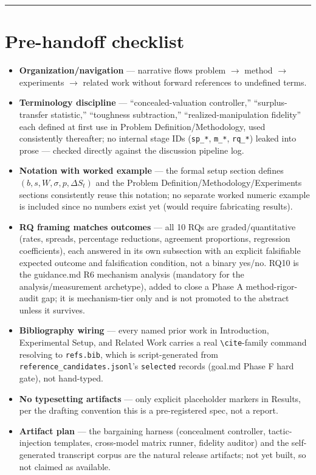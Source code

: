 \documentclass[11pt]{article}
\begin{document}
\vspace{1em}
\hrule
\vspace{1em}

\section*{Pre-handoff checklist}
\begin{itemize}[leftmargin=1.4em]
\item \textbf{Organization/navigation} --- narrative flows problem $\to$ method $\to$ experiments $\to$ related work without forward references to undefined terms.
\item \textbf{Terminology discipline} --- ``concealed-valuation controller,'' ``surplus-transfer statistic,'' ``toughness subtraction,'' ``realized-manipulation fidelity'' each defined at first use in Problem Definition/Methodology, used consistently thereafter; no internal stage IDs (\texttt{sp\_*}, \texttt{m\_*}, \texttt{rq\_*}) leaked into prose --- checked directly against the discussion pipeline log.
\item \textbf{Notation with worked example} --- the formal setup section defines $(b, s, W, \sigma, p, \Delta S_t)$ and the Problem Definition/Methodology/Experiments sections consistently reuse this notation; no separate worked numeric example is included since no numbers exist yet (would require fabricating results).
\item \textbf{RQ framing matches outcomes} --- all 10 RQs are graded/quantitative (rates, spreads, percentage reductions, agreement proportions, regression coefficients), each answered in its own subsection with an explicit falsifiable expected outcome and falsification condition, not a binary yes/no. RQ10 is the guidance.md R6 mechanism analysis (mandatory for the analysis/measurement archetype), added to close a Phase A method-rigor-audit gap; it is mechanism-tier only and is not promoted to the abstract unless it survives.
\item \textbf{Bibliography wiring} --- every named prior work in Introduction, Experimental Setup, and Related Work carries a real \texttt{\textbackslash cite}-family command resolving to \texttt{refs.bib}, which is script-generated from \texttt{reference\_candidates.jsonl}'s \texttt{selected} records (goal.md Phase F hard gate), not hand-typed.
\item \textbf{No typesetting artifacts} --- only explicit placeholder markers in Results, per the drafting convention this is a pre-registered spec, not a report.
\item \textbf{Artifact plan} --- the bargaining harness (concealment controller, tactic-injection templates, cross-model matrix runner, fidelity auditor) and the self-generated transcript corpus are the natural release artifacts; not yet built, so not claimed as available.
\end{itemize}
\end{document}
